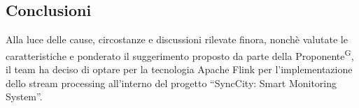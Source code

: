 \documentclass[8pt]{article}
\newcommand{\glossterm}[1]{#1\textsuperscript{G}} %
\begin{document}
\subsection{Conclusioni}
Alla luce delle cause, circostanze e discussioni rilevate finora, nonchè valutate le caratteristiche e ponderato il suggerimento proposto da parte della \glossterm{Proponente}, il team ha 
deciso di optare per la tecnologia Apache Flink per l'implementazione dello stream processing all'interno del progetto ``SyncCity: Smart Monitoring System''.
\end{document}
